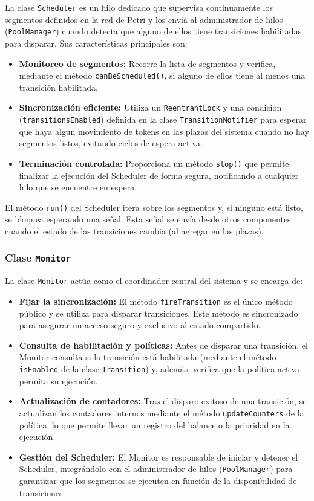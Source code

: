 \documentclass[12pt]{article}
\begin{document}
La clase \texttt{Scheduler} es un hilo dedicado que supervisa continuamente los segmentos definidos en la red de Petri y los envía al administrador de hilos (\texttt{PoolManager}) cuando detecta que alguno de ellos tiene transiciones habilitadas para disparar. Sus características principales son:
\begin{itemize}
    \item \textbf{Monitoreo de segmentos:} Recorre la lista de segmentos y verifica, mediante el método \texttt{canBeScheduled()}, si alguno de ellos tiene al menos una transición habilitada.
    \item \textbf{Sincronización eficiente:} Utiliza un \texttt{ReentrantLock} y una condición (\texttt{transitionsEnabled}) definida en la clase \texttt{TransitionNotifier} para esperar que haya algun movimiento de tokens en las plazas del sistema cuando no hay segmentos listos, evitando ciclos de espera activa.
    \item \textbf{Terminación controlada:} Proporciona un método \texttt{stop()} que permite finalizar la ejecución del Scheduler de forma segura, notificando a cualquier hilo que se encuentre en espera.
\end{itemize}

El método \texttt{run()} del Scheduler itera sobre los segmentos y, si ninguno está listo, se bloquea esperando una señal. Esta señal se envía desde otros componentes cuando el estado de las transiciones cambia (al agregar  en las plazas).

\subsubsection{Clase \texttt{Monitor}}

La clase \texttt{Monitor} actúa como el coordinador central del sistema y se encarga de:
\begin{itemize}
    \item \textbf{Fijar la sincronización:} El método \texttt{fireTransition} es el único método público y se utiliza para disparar transiciones. Este método es sincronizado para asegurar un acceso seguro y exclusivo al estado compartido.
    \item \textbf{Consulta de habilitación y políticas:} Antes de disparar una transición, el Monitor consulta si la transición está habilitada (mediante el método \texttt{isEnabled} de la clase \texttt{Transition}) y, además, verifica que la política activa permita su ejecución.
    \item \textbf{Actualización de contadores:} Tras el disparo exitoso de una transición, se actualizan los contadores internos mediante el método \texttt{updateCounters} de la política, lo que permite llevar un registro del balance o la prioridad en la ejecución.
    \item \textbf{Gestión del Scheduler:} El Monitor es responsable de iniciar y detener el Scheduler, integrándolo con el administrador de hilos (\texttt{PoolManager}) para garantizar que los segmentos se ejecuten en función de la disponibilidad de transiciones.
\end{itemize}
\end{document}
